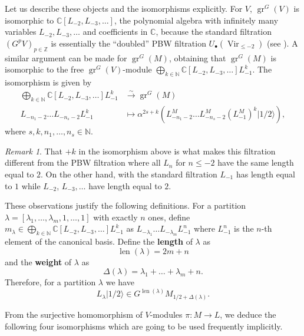 \documentclass[12pt, reqno]{amsart}
\theoremstyle{remark}
\newtheorem{remark}[theorem]{Remark}
\DeclareMathOperator{\Vir}{Vir}
\DeclareMathOperator{\gr}{gr}
\DeclareMathOperator{\len}{len}
\newcommand{\vachalf}{|1/2\rangle}
\begin{document}
Let us describe these objects and the isomorphisms explicitly.
For $V$, $\gr^G(V)$ is isomorphic to $\mathbb{C}[L_{-2}, L_{-3}, \dots]$, the polynomial algebra with infinitely many variables $L_{-2}, L_{-3}, \dots$ and coefficients in $\mathbb{C}$, because the standard filtration $(G^pV)_{p \in \mathbb{Z}}$ is essentially the ``doubled'' PBW filtration $U_\bullet(\Vir_{\le -2})$ (see \cite{arakawa_remark_2012}).
A similar argument can be made for $\gr^G(M)$, obtaining that $\gr^G(M)$ is isomorphic to the free $\gr^G(V)$-module $\bigoplus_{k \in \mathbb{N}}\mathbb{C}[L_{-2}, L_{-3}, \dots]L_{-1}^k$.
The isomorphism is given by
\begin{align*}
  \bigoplus_{k \in \mathbb{N}}\mathbb{C}[L_{-2}, L_{-3}, \dots]L_{-1}^k &\xrightarrow{\sim} \gr^G(M) \\
  L_{-n_1 - 2}\dots L_{-n_s - 2}L_{-1}^k &\mapsto \alpha^{2s + k}(L_{-n_1 - 2}^M\dots L_{-n_s - 2}^M(L_{-1}^M)^k\vachalf),
\end{align*}
where $s, k, n_1, \dots, n_s \in \mathbb{N}$.

\begin{remark}
  \label{rmk:3}
  That $+k$ in the isomorphism above is what makes this filtration different from the PBW filtration where all $L_n$ for $n \le -2$ have the same length equal to $2$.
  On the other hand, with the standard filtration $L_{-1}$ has length equal to $1$ while $L_{-2}$, $L_{-3}, \dots$ have length equal to $2$.
\end{remark}

These observations justify the following definitions.
For a partition $\lambda = [\lambda_1, \dots, \lambda_m, 1, \dots, 1]$ with exactly $n$ ones, define $m_\lambda \in \bigoplus_{k \in \mathbb{N}}\mathbb{C}[L_{-2}, L_{-3}, \dots]L_{-1}^k$ as $L_{-\lambda_1}\dots L_{-\lambda_m}L_{-1}^n$ where $L_{-1}^n$ is the $n$-th element of the canonical basis.
Define the \textbf{length} of $\lambda$ as
\begin{equation*}
  \len(\lambda) = 2m + n
\end{equation*}
and the \textbf{weight} of $\lambda$ as
\begin{equation*}
  \Delta(\lambda) = \lambda_1 + \dots + \lambda_m + n.
\end{equation*}
Therefore, for a partition $\lambda$ we have
\begin{equation*}
  L_{\lambda}\vachalf \in G^{\len(\lambda)}M_{1/2 + \Delta(\lambda)}.
\end{equation*}

From the surjective homomorphism of $V$-modules $\pi: M \to L$, we deduce the following four isomorphisms which are going to be used frequently implicitly.
\end{document}
